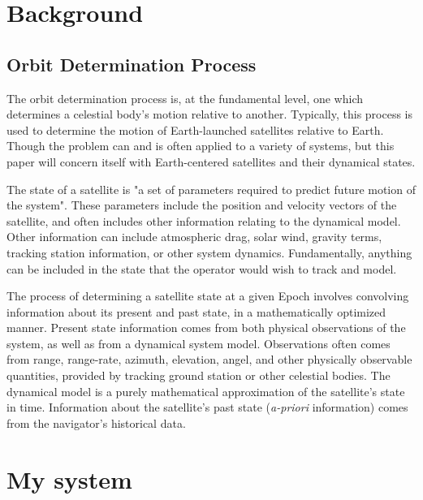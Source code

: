 \documentclass[12pt,a4paper,oneside]{article}
\begin{document}
\newpage
\section{Background}

\subsection{Orbit Determination Process}
The orbit determination process is, at the fundamental level, one which determines a celestial body's motion relative to another. Typically, this process is used to determine the motion of Earth-launched satellites relative to Earth. Though the problem can and is often applied to a variety of systems, but this paper will concern itself with Earth-centered satellites and their dynamical states. 

The state of a satellite is "a set of parameters required to predict future motion of the system"\cite{tapley2004statistical}. These parameters include the position and velocity vectors of the satellite, and often includes other information relating to the dynamical model. Other information can include atmospheric drag, solar wind, gravity terms, tracking station information, or other system dynamics. Fundamentally, anything can be included in the state that the operator would wish to track and model. 

The process of determining a satellite state at a given Epoch involves convolving information about its present and past state, in a mathematically optimized manner. Present state information comes from both physical observations of the system, as well as from a dynamical system model. Observations often comes from range, range-rate, azimuth, elevation, angel, and other physically observable quantities, provided by tracking ground station or other celestial bodies. The dynamical model is a purely mathematical approximation of the satellite's state in time. Information about the satellite's past state (\emph{a-priori} information) comes from the navigator's historical data. 




\section{My system}








\newpage



%
\end{document}
